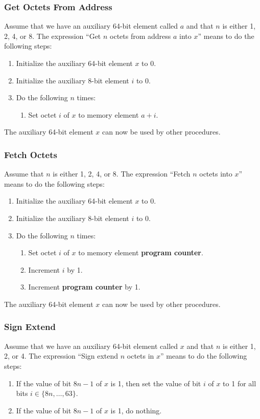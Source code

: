 \documentclass[a4paper,12pt]{article}
\newcommand{\PC}{\textbf{program counter}\xspace}
\newcommand{\range}[2]{\{#1,\ldots,#2\}}
\begin{document}
\subsubsection{Get Octets From Address}

Assume that we have an auxiliary 64-bit element called $a$ and that $n$ is either 1, 2, 4, or 8.
The expression ``Get $n$ octets from address $a$ into $x$'' means to do the following steps:
\begin{enumerate}
\item Initialize the auxiliary 64-bit element $x$ to 0.
\item Initialize the auxiliary 8-bit element $i$ to 0.
\item Do the following $n$ times:
  \begin{enumerate}
  \item Set octet $i$ of $x$ to memory element $a+i$.
  \end{enumerate}
\end{enumerate}
The auxiliary 64-bit element $x$ can now be used by other procedures.

\subsubsection{Fetch Octets}

Assume that $n$ is either 1, 2, 4, or 8.
The expression ``Fetch $n$ octets into $x$'' means to do the following steps:
\begin{enumerate}
\item Initialize the auxiliary 64-bit element $x$ to 0.
\item Initialize the auxiliary 8-bit element $i$ to 0.
\item Do the following $n$ times:
  \begin{enumerate}
  \item Set octet $i$ of $x$ to memory element \PC.
  \item Increment $i$ by 1.
  \item Increment \PC by 1.
  \end{enumerate}
\end{enumerate}
The auxiliary 64-bit element $x$ can now be used by other procedures.

\subsubsection{Sign Extend}

Assume that we have an auxiliary 64-bit element called $x$ and that $n$ is either 1, 2, or 4.
The expression ``Sign extend $n$ octets in $x$'' means to do the following steps:
\begin{enumerate}
\item If the value of bit $8n-1$ of $x$ is 1, then set the value of bit $i$ of $x$ to 1 for all bits $i \in \range{8n}{63}$.
\item If the value of bit $8n-1$ of $x$ is 1, do nothing.
\end{enumerate}
\end{document}
